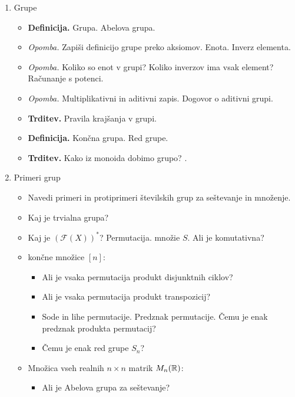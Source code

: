 \begin{enumerate}
    \item Grupe
    \begin{itemize}
        \item \colorbox{purple!30}{\textbf{Definicija.}} Grupa. Abelova grupa.
        \item \colorbox{yellow!30}{\emph{Opomba.}} Zapiši definicijo grupe preko aksiomov. Enota. Inverz elementa.
        \item \colorbox{yellow!30}{\emph{Opomba.}} Koliko so enot v grupi? Koliko inverzov ima vsak element? Računanje s potenci.
        \item \colorbox{yellow!30}{\emph{Opomba.}} Multiplikativni in aditivni zapis. Dogovor o aditivni grupi.
        \item \colorbox{blue!30}{\textbf{Trditev.}} Pravila krajšanja v grupi.
        \item \colorbox{purple!30}{\textbf{Definicija.}} Končna grupa. Red grupe.
        \item \colorbox{blue!30}{\textbf{Trditev.}} Kako iz monoida dobimo grupo? .    
    \end{itemize}
    \item Primeri grup
    \begin{itemize}
        \item Navedi primeri in protiprimeri številskih grup za seštevanje in množenje.
        \item Kaj je trvialna grupa?
        \item Kaj je $(\mathcal{F}(X))^*$? Permutacija.  množie $S$. Ali je komutativna?
        \item {} končne množice $[n]$:
        \begin{itemize}
            \item Ali je vsaka permutacija produkt disjunktnih ciklov?
            \item Ali je vsaka permutacija produkt transpozicij?
            \item Sode in lihe permutacije. Predznak permutacije. Čemu je enak predznak produkta permutacij?
            \item Čemu je enak red grupe $S_n$?
        \end{itemize}
        \item Množica vseh realnih $n \times n$ matrik $M_n(\mathbb{R})$:
        \begin{itemize}
            \item Ali je Abelova grupa za seštevanje?

\end{itemize}
\end{itemize}
\end{enumerate}
